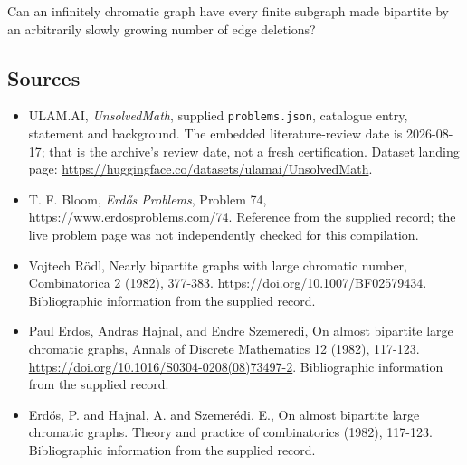 \documentclass[11pt,a4paper]{article}
\begin{document}
Can an infinitely chromatic graph have every finite subgraph made bipartite by an arbitrarily slowly growing number of edge deletions?

\subsection{Sources}

{\small

\begin{itemize}

\item[\hypertarget{source:statement:1}{S1}] ULAM.AI, \emph{UnsolvedMath}, supplied \texttt{problems.json}, catalogue entry, statement and background. The embedded literature-review date is 2026-08-17; that is the archive’s review date, not a fresh certification. Dataset landing page: \url{https://huggingface.co/datasets/ulamai/UnsolvedMath}.

\item[\hypertarget{source:statement:2}{S2}] T. F. Bloom, \emph{Erdős Problems}, Problem 74, \url{https://www.erdosproblems.com/74}. Reference from the supplied record; the live problem page was not independently checked for this compilation.

\item[\hypertarget{source:statement:3}{S3}] Vojtech Rödl, Nearly bipartite graphs with large chromatic number, Combinatorica 2 (1982), 377-383. \url{https://doi.org/10.1007/BF02579434}. Bibliographic information from the supplied record.

\item[\hypertarget{source:statement:4}{S4}] Paul Erdos, Andras Hajnal, and Endre Szemeredi, On almost bipartite large chromatic graphs, Annals of Discrete Mathematics 12 (1982), 117-123. \url{https://doi.org/10.1016/S0304-0208(08)73497-2}. Bibliographic information from the supplied record.

\item[\hypertarget{source:statement:5}{S5}] Erd\H{o}s, P. and Hajnal, A. and Szemer\'{e}di, E., On almost bipartite large chromatic graphs. Theory and practice of combinatorics (1982), 117-123. Bibliographic information from the supplied record.

\end{itemize}

}

\label{end:statement}
\end{document}
